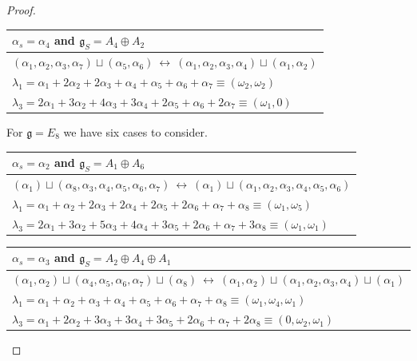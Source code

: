 \documentclass[a4paper, 12pt, reqno, english]{amsart}
\numberwithin{equation}{section}
\numberwithin{figure}{section}
\theoremstyle{plain}
\theoremstyle{plain}
\theoremstyle{plain}
\theoremstyle{plain}
\theoremstyle{plain}
\theoremstyle{definition}
\theoremstyle{definition}
\theoremstyle{definition}
\theoremstyle{remark}
\theoremstyle{definition}
\theoremstyle{definition}
\newcommand{\lieg}{\mathfrak{g}}
\begin{document}
\begin{proof}
{\renewcommand{\arraystretch}{1.4}
\begin{center}
\begin{tabular}{|l|} 
\hline
$\alpha_s = \alpha_4$ and $\lieg_S = A_4 \oplus A_2$ \\
\hline \hline
$(\alpha_1, \alpha_2, \alpha_3, \alpha_7) \sqcup (\alpha_5, \alpha_6) \ \leftrightarrow \ (\alpha_1, \alpha_2, \alpha_3, \alpha_4) \sqcup (\alpha_1, \alpha_2)$ \\
\hline
$\lambda_1 = \alpha_1 + 2 \alpha_2 + 2 \alpha_3 + \alpha_4 + \alpha_5 + \alpha_6 + \alpha_7 \equiv (\omega_2, \omega_2)$ \\
\hline
$\lambda_3 = 2 \alpha_1 + 3 \alpha_2 + 4 \alpha_3 + 3 \alpha_4 + 2 \alpha_5 + \alpha_6 + 2 \alpha_7 \equiv (\omega_1, 0)$ \\
\hline
\end{tabular}
\end{center}}

For $\lieg = E_8$ we have six cases to consider.

{\renewcommand{\arraystretch}{1.4}
\begin{center}
\begin{tabular}{|l|} 
\hline
$\alpha_s = \alpha_2$ and $\lieg_S = A_1 \oplus A_6$ \\
\hline \hline
$(\alpha_1) \sqcup (\alpha_8, \alpha_3, \alpha_4, \alpha_5, \alpha_6, \alpha_7) \ \leftrightarrow \ (\alpha_1) \sqcup (\alpha_1, \alpha_2, \alpha_3, \alpha_4, \alpha_5, \alpha_6)$ \\
\hline
$\lambda_1 = \alpha_1 + \alpha_2 + 2 \alpha_3 + 2 \alpha_4 + 2 \alpha_5 + 2 \alpha_6 + \alpha_7 + \alpha_8 \equiv (\omega_1, \omega_5)$ \\
\hline
$\lambda_3 = 2 \alpha_1 + 3 \alpha_2 + 5 \alpha_3 + 4 \alpha_4 + 3 \alpha_5 + 2 \alpha_6 + \alpha_7 + 3 \alpha_8 \equiv (\omega_1, \omega_1)$ \\
\hline
\end{tabular}
\end{center}}

{\renewcommand{\arraystretch}{1.4}
\begin{center}
\begin{tabular}{|l|} 
\hline
$\alpha_s = \alpha_3$ and $\lieg_S = A_2 \oplus A_4 \oplus A_1$ \\
\hline \hline
$(\alpha_1, \alpha_2) \sqcup (\alpha_4, \alpha_5, \alpha_6, \alpha_7) \sqcup (\alpha_8) \ \leftrightarrow \ (\alpha_1, \alpha_2) \sqcup (\alpha_1, \alpha_2, \alpha_3, \alpha_4) \sqcup (\alpha_1)$ \\
\hline
$\lambda_1 = \alpha_1 + \alpha_2 + \alpha_3 + \alpha_4 + \alpha_5 + \alpha_6 + \alpha_7 + \alpha_8 \equiv (\omega_1, \omega_4, \omega_1)$ \\
\hline
$\lambda_3 = \alpha_1 + 2 \alpha_2 + 3 \alpha_3 + 3 \alpha_4 + 3 \alpha_5 + 2 \alpha_6 + \alpha_7 + 2 \alpha_8 \equiv (0, \omega_2, \omega_1)$ \\
\hline
\end{tabular}
\end{center}}


\end{proof}
\end{document}
